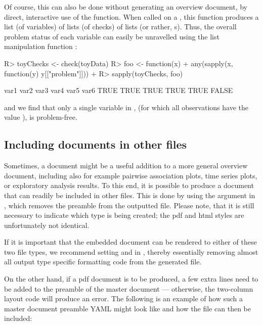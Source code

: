 \documentclass[article,shortnames]{jss}
\begin{document}
Of course, this can also be done without generating an overview
document, by direct, interactive use of the  function. When
called on a , this function produces a list (of
variables) of lists (of checks) of lists (or rather,
s). Thus, the overall problem status of each variable
can easily be unravelled using the list manipulation function
:

\begin{Schunk}
\begin{Sinput}
R> toyChecks <- check(toyData)
R> foo <- function(x) {
+    any(sapply(x, function(y) y[["problem"]]))
+  }
R> sapply(toyChecks, foo)
\end{Sinput}
\begin{Soutput}
 var1  var2  var3  var4  var5  var6 
 TRUE  TRUE  TRUE  TRUE  TRUE FALSE 
\end{Soutput}
\end{Schunk}

and we find that only a single variable in ,  (for which all
observations have the value ), is problem-free.


\subsection[Including dataMaid documents in other files]{Including  documents in other files}
Sometimes, a  document might be a useful addition to a
more general overview document, including also for example pairwise
association plots, time series plots, or exploratory analysis
results. To this end, it is possible to produce a 
document that can readily be included in other 
files. This is done by using the  argument in ,
which removes the preamble from the outputted 
file. Please note, that it is still necessary to indicate which
 type is being created; the pdf and html 
styles are unfortunately not identical.

If it is important that the embedded  document can be
rendered to either of these two file types, we recommend setting
 and  in , thereby
essentially removing almost all output type specific formatting code
from the generated  file.

On the other hand, if a pdf document is to be produced, a few extra
lines need to be added to the preamble of the master 
document --- otherwise, the two-column layout code will produce an
error. The following is an example of how such a master document
preamble YAML might look like and how the  file can
then be included:
\end{document}
